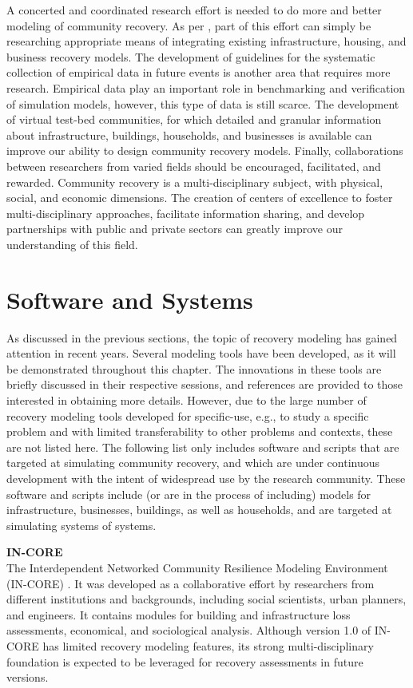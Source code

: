 A concerted and coordinated research effort is needed to do more and better modeling of community recovery. As per \citep{miles2019community}, part of this effort can simply be researching appropriate means of integrating existing infrastructure, housing, and business recovery models. The development of guidelines for the systematic collection of empirical data in future events is another area that requires more research. Empirical data play an important role in benchmarking and verification of simulation models, however, this type of data is still scarce. The development of virtual test-bed communities, for which detailed and granular information about infrastructure, buildings, households, and businesses is available can improve our ability to design community recovery models. Finally, collaborations between researchers from varied fields should be encouraged, facilitated, and rewarded. Community recovery is a multi-disciplinary subject, with physical, social, and economic dimensions. The creation of centers of excellence to foster multi-disciplinary approaches, facilitate information sharing, and develop partnerships with public and private sectors can greatly improve our understanding of this field.\ 

\FloatBarrier
\section{Software and Systems}
As discussed in the previous sections, the topic of recovery modeling has gained attention in recent years. Several modeling tools have been developed, as it will be demonstrated throughout this chapter. The innovations in these tools are briefly discussed in their respective sessions, and references are provided to those interested in obtaining more details. However, due to the large number of recovery modeling tools developed for specific-use, e.g., to study a specific problem and with limited transferability to other problems and contexts, these are not listed here. The following list only includes software and scripts that are targeted at simulating community recovery, and which are under continuous development with the intent of widespread use by the research community. These software and scripts include (or are in the process of including) models for infrastructure, businesses, buildings, as well as households, and are targeted at simulating systems of systems.\

\noindent\textbf{IN-CORE}\\ The Interdependent Networked Community Resilience Modeling Environment (IN-CORE) \citep{InCORE}. It was developed as a collaborative effort by researchers from different institutions and backgrounds, including social scientists, urban planners, and engineers. It contains modules for building and infrastructure loss assessments, economical, and sociological analysis. Although version 1.0 of IN-CORE has limited recovery modeling features, its strong multi-disciplinary foundation is expected to be leveraged for recovery assessments in future versions.\ 

